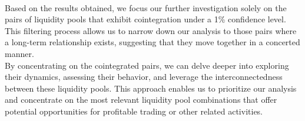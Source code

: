 \\[5mm]
\noindent Based on the results obtained, we focus our further investigation solely on the pairs of liquidity pools that exhibit cointegration under a 1\% confidence level. This filtering process allows us to narrow down our analysis to those pairs where a long-term relationship exists, suggesting that they move together in a concerted manner.
\\[5mm]
By concentrating on the cointegrated pairs, we can delve deeper into exploring their dynamics, assessing their behavior, and leverage the interconnectedness between these liquidity pools. This approach enables us to prioritize our analysis and concentrate on the most relevant liquidity pool combinations that offer potential opportunities for profitable trading or other related activities.



